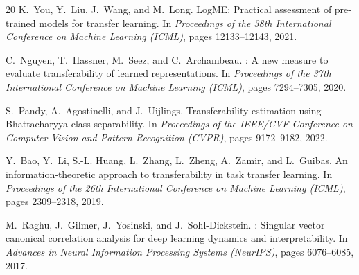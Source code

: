 \documentclass[UTF8,fontset=fandol]{ctexart}
\theoremstyle{remark}
\begin{document}
\begin{thebibliography}{20}
K.~You, Y.~Liu, J.~Wang, and M.~Long.
\newblock Log{ME}: Practical assessment of pre-trained models for transfer learning.
\newblock In {\em Proceedings of the 38th International Conference on Machine Learning (ICML)}, pages 12133--12143, 2021.

C.~Nguyen, T.~Hassner, M.~Seez, and C.~Archambeau.
: A new measure to evaluate transferability of learned representations.
\newblock In {\em Proceedings of the 37th International Conference on Machine Learning (ICML)}, pages 7294--7305, 2020.

S.~Pandy, A.~Agostinelli, and J.~Uijlings.
\newblock Transferability estimation using {B}hattacharyya class separability.
\newblock In {\em Proceedings of the IEEE/CVF Conference on Computer Vision and Pattern Recognition (CVPR)}, pages 9172--9182, 2022.

Y.~Bao, Y.~Li, S.-L. Huang, L.~Zhang, L.~Zheng, A.~Zamir, and L.~Guibas.
\newblock An information-theoretic approach to transferability in task transfer learning.
\newblock In {\em Proceedings of the 26th International Conference on Machine Learning (ICML)}, pages 2309--2318, 2019.

M.~Raghu, J.~Gilmer, J.~Yosinski, and J.~Sohl-Dickstein.
: Singular vector canonical correlation analysis for deep learning dynamics and interpretability.
\newblock In {\em Advances in Neural Information Processing Systems (NeurIPS)}, pages 6076--6085, 2017.

\end{thebibliography}
\end{document}
